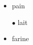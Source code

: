 \documentclass{scrartcl}
\begin{document}


\begin{itemize}
   \item pain
   \item[$\bullet$] lait
   \item farine
\end{itemize}
\end{document}

